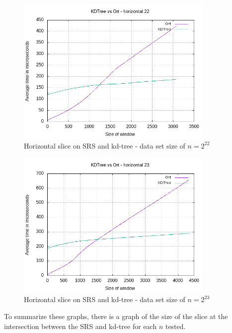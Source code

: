 \begin{figure}[h]
    \centering
    \includegraphics[width = 0.85\textwidth]{pictures/analysis/hori_22.png}
    \caption{Horizontal slice on SRS and kd-tree - data set size of $n=2^{22}$}\label{fig:hori_22}
\end{figure}

\begin{figure}[h]
    \centering
    \includegraphics[width = 0.85\textwidth]{pictures/analysis/hori_23.png}
    \caption{Horizontal slice on SRS and kd-tree - data set size of $n=2^{23}$}\label{fig:hori_23}
\end{figure}


To summarize these graphs, there is a graph of the size of the slice at the intersection between the SRS and kd-tree for each $n$ tested.

